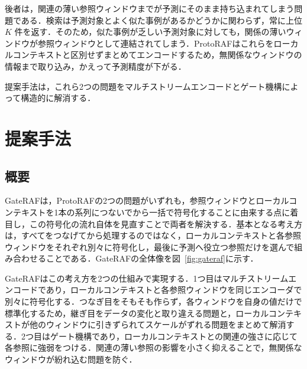 \documentclass[twocolumn, lastpage]{jarticle}
\begin{document}
後者は，関連の薄い参照ウィンドウまでが予測にそのまま持ち込まれてしまう問題である．検索は予測対象とよく似た事例があるかどうかに関わらず，常に上位 $K$ 件を返す．そのため，似た事例が乏しい予測対象に対しても，関係の薄いウィンドウが参照ウィンドウとして連結されてしまう．ProtoRAFはこれらをローカルコンテキストと区別せずまとめてエンコードするため，無関係なウィンドウの情報まで取り込み，かえって予測精度が下がる．

提案手法は，これら2つの問題をマルチストリームエンコードとゲート機構によって構造的に解消する．


\section{提案手法}
\subsection{概要}
GateRAFは，ProtoRAFの2つの問題がいずれも，参照ウィンドウとローカルコンテキストを1本の系列につないでから一括で符号化することに由来する点に着目し，この符号化の流れ自体を見直すことで両者を解決する．基本となる考え方は，すべてをつなげてから処理するのではなく，ローカルコンテキストと各参照ウィンドウをそれぞれ別々に符号化し，最後に予測へ役立つ参照だけを選んで組み合わせることである．GateRAFの全体像を図~\ref{fig:gateraf}に示す．

GateRAFはこの考え方を2つの仕組みで実現する．1つ目はマルチストリームエンコードであり，ローカルコンテキストと各参照ウィンドウを同じエンコーダで別々に符号化する．つなぎ目をそもそも作らず，各ウィンドウを自身の値だけで標準化するため，継ぎ目をデータの変化と取り違える問題と，ローカルコンテキストが他のウィンドウに引きずられてスケールがずれる問題をまとめて解消する．2つ目はゲート機構であり，ローカルコンテキストとの関連の強さに応じて各参照に強弱をつける．関連の薄い参照の影響を小さく抑えることで，無関係なウィンドウが紛れ込む問題を防ぐ．
\end{document}
